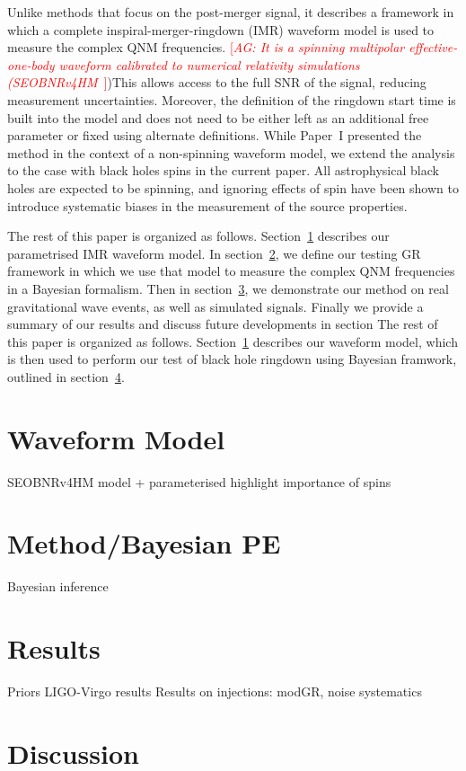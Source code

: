 \documentclass[twocolumn,prd,superscriptaddress,amsfonts,amssymb,amsmath,preprintnumbers]{revtex4-1}
\newcommand{\paperone}{Paper~I\xspace}
\newcommand{\abhi}[1]{\textcolor{red}{[\textit{AG: #1}]}}
\begin{document}
Unlike methods that focus on the post-merger signal, it describes a framework in which a complete inspiral-merger-ringdown (IMR) waveform model is used to measure the complex QNM frequencies. \abhi{It is a spinning multipolar effective-one-body waveform calibrated to numerical relativity simulations (SEOBNRv4HM~\citep{cotesta}})This allows access to the full SNR of the signal, reducing measurement uncertainties. Moreover, the definition of the ringdown start time is built into the model and does not need to be either left as an additional free parameter or fixed using alternate definitions. While \paperone presented the method in the context of a non-spinning waveform model, we extend the analysis to the case with black holes spins in the current paper. All astrophysical black holes are expected to be spinning, and ignoring effects of spin have been shown to introduce systematic biases in the measurement of the source properties.
\par
The rest of this paper is organized as follows. Section~\ref{sec:model} describes our parametrised IMR waveform model. In section~\ref{sec:method}, we define our testing GR framework in which we use that model to measure the complex QNM frequencies in a Bayesian formalism. Then in section~\ref{sec:results}, we demonstrate our method on real gravitational wave events, as well as simulated signals. Finally we provide a summary of our results and discuss future developments in section  The rest of this paper is organized as follows. Section~\ref{sec:model} describes our waveform model, which is then used to perform our test of black hole ringdown using Bayesian framwork, outlined in section~\ref{sec:discussion}.

\section{Waveform Model}\label{sec:model}
SEOBNRv4HM model + parameterised
highlight importance of spins

\section{Method/Bayesian PE}\label{sec:method}
Bayesian inference

\section{Results}\label{sec:results}
Priors
LIGO-Virgo results
Results on injections: modGR, noise systematics

\section{Discussion}\label{sec:discussion}
\end{document}
